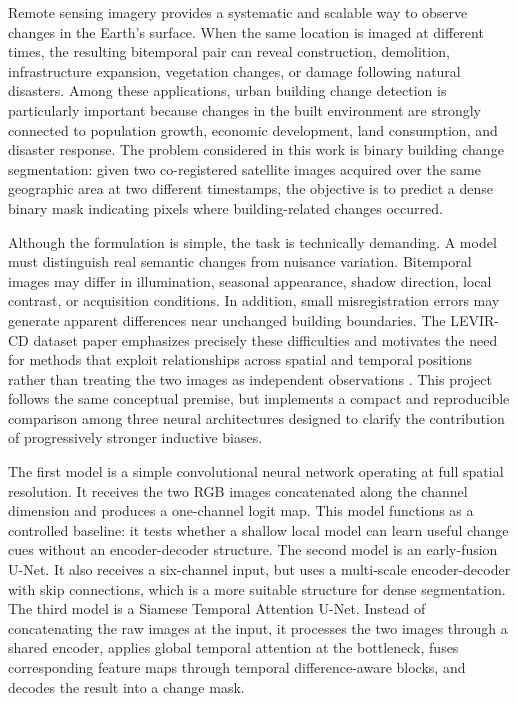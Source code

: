 \documentclass[11pt,a4paper]{article}
\begin{document}
Remote sensing imagery provides a systematic and scalable way to observe changes in the Earth's surface. When the same location is imaged at different times, the resulting bitemporal pair can reveal construction, demolition, infrastructure expansion, vegetation changes, or damage following natural disasters. Among these applications, urban building change detection is particularly important because changes in the built environment are strongly connected to population growth, economic development, land consumption, and disaster response. The problem considered in this work is binary building change segmentation: given two co-registered satellite images acquired over the same geographic area at two different timestamps, the objective is to predict a dense binary mask indicating pixels where building-related changes occurred.

Although the formulation is simple, the task is technically demanding. A model must distinguish real semantic changes from nuisance variation. Bitemporal images may differ in illumination, seasonal appearance, shadow direction, local contrast, or acquisition conditions. In addition, small misregistration errors may generate apparent differences near unchanged building boundaries. The LEVIR-CD dataset paper emphasizes precisely these difficulties and motivates the need for methods that exploit relationships across spatial and temporal positions rather than treating the two images as independent observations \cite{chen2020levir}. This project follows the same conceptual premise, but implements a compact and reproducible comparison among three neural architectures designed to clarify the contribution of progressively stronger inductive biases.

The first model is a simple convolutional neural network operating at full spatial resolution. It receives the two RGB images concatenated along the channel dimension and produces a one-channel logit map. This model functions as a controlled baseline: it tests whether a shallow local model can learn useful change cues without an encoder-decoder structure. The second model is an early-fusion U-Net. It also receives a six-channel input, but uses a multi-scale encoder-decoder with skip connections, which is a more suitable structure for dense segmentation. The third model is a Siamese Temporal Attention U-Net. Instead of concatenating the raw images at the input, it processes the two images through a shared encoder, applies global temporal attention at the bottleneck, fuses corresponding feature maps through temporal difference-aware blocks, and decodes the result into a change mask.
\end{document}
